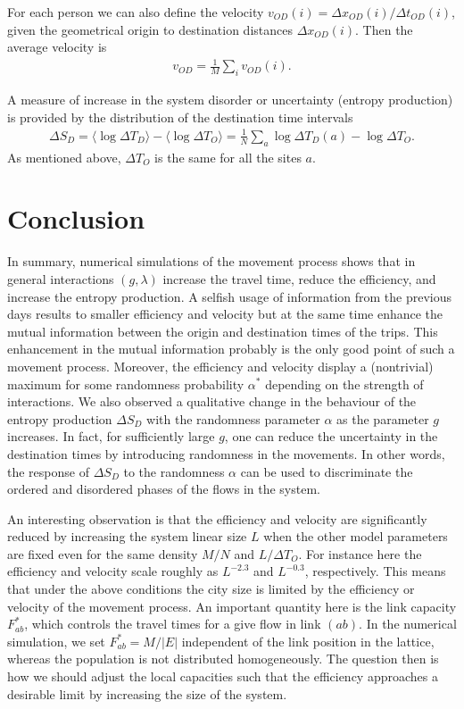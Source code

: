 \documentclass[aps,preprint]{revtex4-1}
\begin{document}
For each person we can also define the velocity $v_{OD}(i)=\Delta x_{OD}(i)/\Delta t_{OD}(i)$, given the geometrical origin to destination distances $\Delta x_{OD}(i)$. Then the average velocity is
\begin{align}
v_{OD}=\frac{1}{M}\sum_{i} v_{OD}(i).
\end{align}


A measure of increase in the system disorder or uncertainty (entropy production) is provided by the distribution of the destination time intervals  
\begin{align}
\Delta S_D=\langle \log \Delta T_D \rangle-\langle \log \Delta T_O \rangle=\frac{1}{N}\sum_a \log \Delta T_D(a)-\log \Delta T_O.
\end{align}
As mentioned above, $\Delta T_O$ is the same for all the sites $a$.





\section{Conclusion}\label{S3}
In summary, numerical simulations of the movement process shows that in general interactions $(g,\lambda)$ increase the travel time, reduce the efficiency, and increase the entropy production. A selfish usage of information from the previous days results to smaller efficiency and velocity but at the same time enhance the mutual information between the origin and destination times of the trips. This enhancement in the mutual information probably is the only good point of such a movement process. Moreover, the efficiency and velocity display a (nontrivial) maximum for some randomness probability $\alpha^*$ depending on the strength of interactions. We also observed a qualitative change in the behaviour of the entropy production $\Delta S_D$ with the randomness parameter $\alpha$ as the parameter $g$ increases. In fact, for sufficiently large $g$, one can reduce the uncertainty in the destination times by introducing randomness in the movements. In other words, the response of $\Delta S_D$ to the randomness $\alpha$ can be used to discriminate the ordered and disordered phases of the flows in the system.

An interesting observation is that the efficiency and velocity are significantly reduced by increasing the system linear size $L$ when the other model parameters are fixed even for the same density $M/N$ and $L/\Delta T_O$.  For instance here the efficiency and velocity scale roughly as $L^{-2.3}$ and $L^{-0.3}$, respectively. This means that under the above conditions the city size is limited by the efficiency or velocity of the movement process. An important quantity here is the link capacity $F^*_{ab}$, which controls the travel times for a give flow in link $(ab)$. In the numerical simulation, we set $F^*_{ab}=M/|E|$ independent of the link position in the lattice, whereas the population is not distributed homogeneously. The question then is how we should adjust the local capacities such that the efficiency approaches a desirable limit by increasing the size of the system.  
\end{document}
